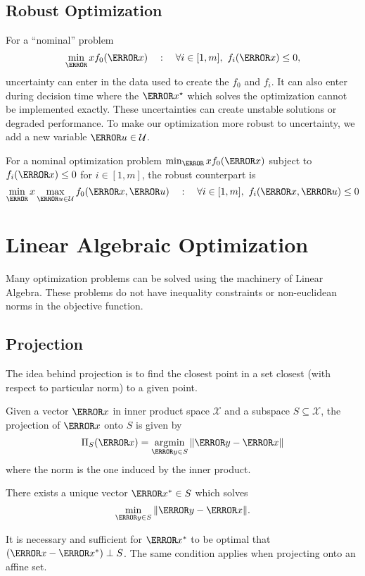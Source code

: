 \subsection{Robust Optimization}
For a ``nominal'' problem \[
	\min_\V{x} f_0(\V{x}) \quad : \quad \forall i\in[1,m],\ f_i(\V{x}) \leq 0,
\]
uncertainty can enter in the data used to create the $f_0$ and $f_i$.
It can also enter during decision time where the $\V{x}^\star$ which solves the optimization cannot be implemented exactly.
These uncertainties can create unstable solutions or degraded performance.
To make our optimization more robust to uncertainty, we add a new variable $\V{u}\in\mathcal{U}$.
\begin{definition}
	For a nominal optimization problem $\min_\V{x} f_0(\V{x})$ subject to $f_i(\V{x}) \leq 0$ for $i\in[1,m]$, the robust counterpart is \[
		\min_\V{x} \max_{\V{u}\in\mathcal{U}} f_0(\V{x}, \V{u}) \quad : \quad \forall i\in[1,m],\ f_i(\V{x}, \V{u}) \leq 0
	\]
	\label{defn:robust-counterpart}
\end{definition}
\section{Linear Algebraic Optimization}
Many optimization problems can be solved using the machinery of Linear Algebra.
These problems do not have inequality constraints or non-euclidean norms in the objective function.
\subsection{Projection}
The idea behind projection is to find the closest point in a set closest (with respect to particular norm) to a given point.
\begin{definition}
  Given a vector $\V{x}$ in inner product space $\mathcal{X}$ and a subspace $S\subseteq\mathcal{X}$, the projection of $\V{x}$ onto $S$ is given by
  \[
	\Pi_S(\V{x}) = \argmin_{\V{y}\in S}\norm{\V{y}-\V{x}}
  \]
  where the norm is the one induced by the inner product.
  \label{defn:projection}
\end{definition}
\begin{theorem}
  There exists a unique vector $\V{x}^*\in S$ which solves
  \[
	\min_{\V{y}\in S} \norm{\V{y}-\V{x}}.
  \]
  \label{thm:projection}
\end{theorem} It is necessary and sufficient for $\V{x}^*$ to be optimal that $(\V{x}-\V{x}^*)\perp S$.
The same condition applies when projecting onto an affine set.
